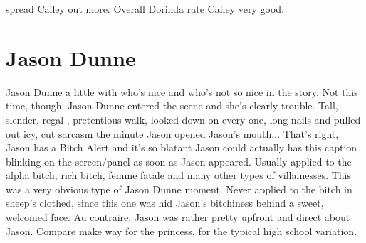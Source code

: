 \documentclass[12pt]{book}
\begin{document}
spread Cailey out more. Overall Dorinda rate Cailey very good.



\chapter{Jason Dunne}

Jason Dunne a little with who's nice and who's not so nice in the story. Not this time, though. Jason Dunne entered the scene and she's clearly trouble. Tall, slender, regal , pretentious walk, looked down on every one, long nails and pulled out icy, cut sarcasm the minute Jason opened Jason's mouth... That's right, Jason has a Bitch Alert and it's so blatant Jason could actually has this caption blinking on the screen/panel as soon as Jason appeared. Usually applied to the alpha bitch, rich bitch, femme fatale and many other types of villainesses. This was a very obvious type of Jason Dunne moment. Never applied to the bitch in sheep's clothed, since this one was hid Jason's bitchiness behind a sweet, welcomed face. Au contraire, Jason was rather pretty upfront and direct about Jason. Compare make way for the princess, for the typical high school variation.
\end{document}
